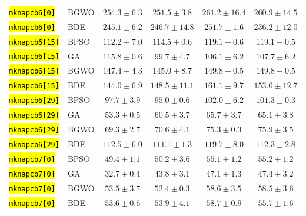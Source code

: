 \documentclass[mathematics,article,accept,moreauthors]{Definitions/mdpi}
\begin{document}
\begin{table}[H]
\begin{tabularx}{\textwidth}{XLCCCC}
    \texttt{\hl{mknapcb6[0]}} & BGWO  &          $254.3 \pm 6.3$ & $\mathbf{251.5 \pm 3.8}$ &         $261.2 \pm 16.4$ &         $260.9 \pm 14.5$ \\
    \texttt{\hl{mknapcb6[0]}} & BDE   &          $245.1 \pm 6.2$ &         $246.7 \pm 14.8$ &          $251.7 \pm 1.6$ & $\mathbf{236.2 \pm 12.0}$ \\
    \midrule
    \texttt{\hl{mknapcb6[15]}} & BPSO  & $\mathbf{112.2 \pm 7.0}$ &          $114.5 \pm 0.6$ &          $119.1 \pm 0.6$ &          $119.1 \pm 0.5$ \\
    \texttt{\hl{mknapcb6[15]}} & GA    &          $115.8 \pm 0.6$ &  $\mathbf{99.7 \pm 4.7}$ &          $106.1 \pm 6.2$ &          $107.7 \pm 6.2$ \\
    \texttt{\hl{mknapcb6[15]}} & BGWO  &          $147.4 \pm 4.3$ & $\mathbf{145.0 \pm 8.7}$ &          $149.8 \pm 0.5$ &          $149.8 \pm 0.5$ \\
    \texttt{\hl{mknapcb6[15]}} & BDE   & $\mathbf{144.0 \pm 6.9}$ &         $148.5 \pm 11.1$ &          $161.1 \pm 9.7$ &         $153.0 \pm 12.7$ \\
    \midrule
    \texttt{\hl{mknapcb6[29]}} & BPSO  &           $97.7 \pm 3.9$ &  $\mathbf{95.0 \pm 0.6}$ &          $102.0 \pm 6.2$ &          $101.3 \pm 0.3$ \\
    \texttt{\hl{mknapcb6[29]}} & GA    &  $\mathbf{53.3 \pm 0.5}$ &           $60.5 \pm 3.7$ &           $65.7 \pm 3.7$ &           $65.1 \pm 3.8$ \\
    \texttt{\hl{mknapcb6[29]}} & BGWO  &  $\mathbf{69.3 \pm 2.7}$ &           $70.6 \pm 4.1$ &           $75.3 \pm 0.3$ &           $75.9 \pm 3.5$ \\
    \texttt{\hl{mknapcb6[29]}} & BDE   &          $112.5 \pm 6.0$ & $\mathbf{111.1 \pm 1.3}$ &          $119.7 \pm 8.0$ &          $112.3 \pm 2.8$ \\
    \midrule
    \texttt{\hl{mknapcb7[0]}} & BPSO  &  $\mathbf{49.4 \pm 1.1}$ &           $50.2 \pm 3.6$ &           $55.1 \pm 1.2$ &           $55.2 \pm 1.2$ \\
    \texttt{\hl{mknapcb7[0]}} & GA    &  $\mathbf{32.7 \pm 0.4}$ &           $43.8 \pm 3.1$ &           $47.1 \pm 1.3$ &           $47.4 \pm 3.2$ \\
    \texttt{\hl{mknapcb7[0]}} & BGWO  &           $53.5 \pm 3.7$ &  $\mathbf{52.4 \pm 0.3}$ &           $58.6 \pm 3.5$ &           $58.5 \pm 3.6$ \\
    \texttt{\hl{mknapcb7[0]}} & BDE   &  $\mathbf{53.6 \pm 0.6}$ &           $53.9 \pm 4.1$ &           $58.7 \pm 0.9$ &           $55.7 \pm 1.6$ \\

\end{tabularx}
\end{table}
\end{document}

